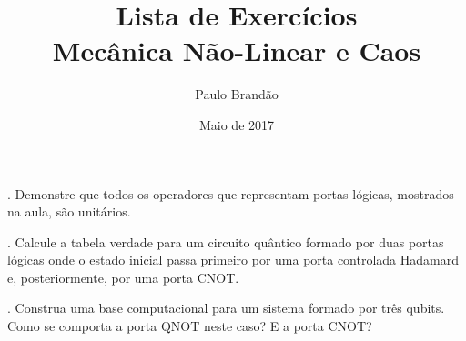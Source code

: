 \documentclass{article}
\title{\color{astral} \textbf{Lista de Exercícios} \\ \textbf{Mecânica Não-Linear e Caos}}
\author{Paulo Brandão}
\date{Maio de 2017}
\begin{document}
\maketitle

. Demonstre que todos os operadores que representam portas lógicas, mostrados na aula, são unitários.

\vspace{1cm}

. Calcule a tabela verdade para um circuito quântico formado por duas portas lógicas onde o estado inicial passa primeiro por uma porta controlada Hadamard e, posteriormente, por uma porta CNOT.

\vspace{1cm}

. Construa uma base computacional para um sistema formado por três qubits. Como se comporta a porta QNOT neste caso? E a porta CNOT?
\end{document}
